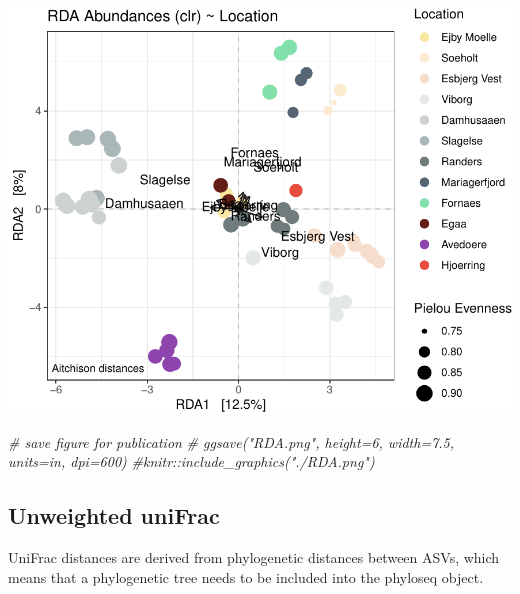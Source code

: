 \documentclass[
]{book}
\newenvironment{Shaded}{\begin{snugshade}}{\end{snugshade}}
\newcommand{\CommentTok}[1]{\textcolor[rgb]{0.56,0.35,0.01}{\textit{#1}}}
\begin{document}
\includegraphics{gitbook-demo_files/figure-latex/rda-1.pdf}

\begin{Shaded}
\begin{Highlighting}[]
\CommentTok{\# save figure for publication}
\CommentTok{\# ggsave("RDA.png", height=6, width=7.5, units=\textquotesingle{}in\textquotesingle{}, dpi=600)}
\CommentTok{\#knitr::include\_graphics("./RDA.png")}
\end{Highlighting}
\end{Shaded}

\hfill\break

\hypertarget{unweighted-unifrac}{%
\subsection{Unweighted uniFrac}\label{unweighted-unifrac}}

UniFrac distances are derived from phylogenetic distances between ASVs, which means that a phylogenetic tree needs to be included into the phyloseq object.
\end{document}
